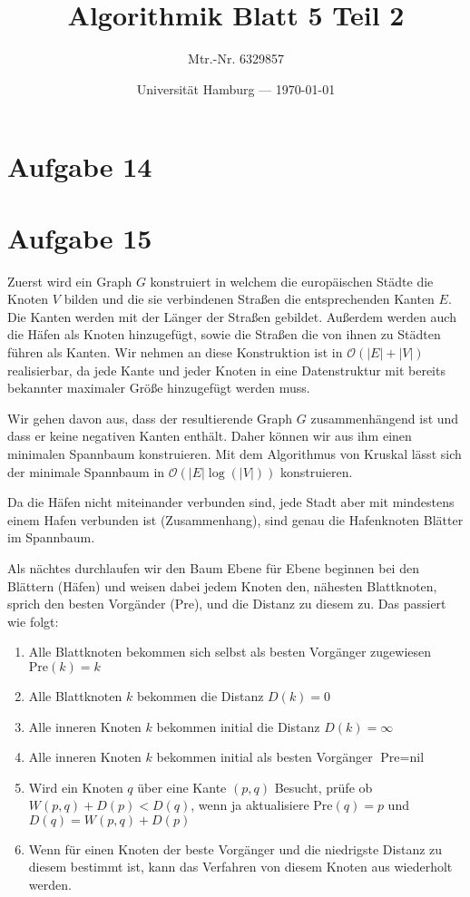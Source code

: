 \documentclass[parskip=half,a4paper]{scrartcl}
\title{Algorithmik Blatt 5 Teil 2}
\author{Mtr.-Nr. 6329857}
\date{Universität Hamburg --- \today}
\begin{document}
\maketitle %

\section*{Aufgabe 14}


\section*{Aufgabe 15}

Zuerst wird ein Graph $G$ konstruiert in welchem die europäischen Städte die Knoten $V$ bilden und die sie verbindenen Straßen die entsprechenden Kanten $E$. Die Kanten werden mit der Länger der Straßen gebildet. Außerdem werden auch die Häfen als Knoten hinzugefügt, sowie die Straßen die von ihnen zu Städten führen als Kanten. Wir nehmen an diese Konstruktion ist in \(\mathcal{O}(|E| + |V|)\) realisierbar, da jede Kante und jeder Knoten in eine Datenstruktur mit bereits bekannter maximaler Grö{\ss}e hinzugefügt werden muss.

Wir gehen davon aus, dass der resultierende Graph $G$ zusammenhängend ist und dass er keine negativen Kanten enthält. Daher können wir aus ihm einen minimalen Spannbaum konstruieren. Mit dem Algorithmus von Kruskal lässt sich der minimale Spannbaum in \(\mathcal{O}(|E|\log(|V|))\) konstruieren.

Da die Häfen nicht miteinander verbunden sind, jede Stadt aber mit mindestens einem Hafen verbunden ist (Zusammenhang), sind genau die Hafenknoten Blätter im Spannbaum.

Als nächtes durchlaufen wir den Baum Ebene für Ebene beginnen bei den Blättern (Häfen) und weisen dabei jedem Knoten den, nähesten Blattknoten, sprich den besten Vorgänder ($\text{Pre}$), und die Distanz zu diesem zu. Das passiert wie folgt:

\begin{enumerate}
    \item Alle Blattknoten bekommen sich selbst als besten Vorgänger zugewiesen $\text{Pre}(k) = k$
    \item Alle Blattknoten $k$ bekommen die Distanz $D(k) = 0$
    \item Alle inneren Knoten $k$ bekommen initial die Distanz $D(k) = \infty$
    \item Alle inneren Knoten $k$ bekommen initial als besten Vorgänger $\text{Pre} = \text{nil}$
    \item Wird ein Knoten $q$ über eine Kante $(p,q)$ Besucht, prüfe ob $W(p,q) + D(p) < D(q)$, wenn ja aktualisiere $\text{Pre}(q) = p$ und $D(q) = W(p,q) + D(p)$
    \item Wenn für einen Knoten der beste Vorgänger und die niedrigste Distanz zu diesem bestimmt ist, kann das Verfahren von diesem Knoten aus wiederholt werden.
\end{enumerate}
\end{document}
